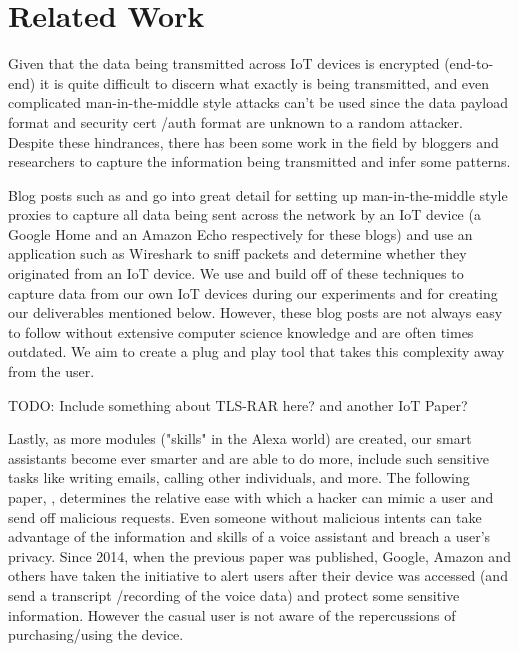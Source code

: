 \documentclass[letterpaper,twocolumn,10pt]{article}
\begin{document}
\section{Related Work}

Given that the data being transmitted across IoT devices is encrypted (end-to-end) it is quite difficult to discern what exactly is being transmitted, and even complicated man-in-the-middle style attacks can’t be used since the data payload format and security cert \slash auth format are unknown to a random attacker. 
Despite these hindrances, there has been some work in the field by bloggers and researchers to capture the information being transmitted and infer some patterns. 

Blog posts such as \cite{ghadiry_2017} and \cite{morgenstern_morgenstern_2018} go into great detail for setting up man-in-the-middle style proxies to capture all data being sent across the network by an IoT device (a Google Home and an Amazon Echo respectively for these blogs) and use an application such as Wireshark to sniff packets and determine whether they originated from an IoT device. 
We use and build off of these techniques to capture data from our own IoT devices during our experiments and for creating our deliverables mentioned below. 
However, these blog posts are not always easy to follow without extensive computer science knowledge and are often times outdated. We aim to create a plug and play tool that takes this complexity away from the user.

TODO: Include something about TLS-RAR here? and another IoT Paper?

Lastly, as more modules ("skills" in the Alexa world) are created, our smart assistants become ever smarter and are able to do more, include such sensitive tasks like writing emails, calling other individuals, and more. 
The following paper, \cite{Diao2014YVA2666620.2666623}, determines the relative ease with which a hacker can mimic a user and send off malicious requests. 
Even someone without malicious intents can take advantage of the information and skills of a voice assistant and breach a user’s privacy. 
Since 2014, when the previous paper was published, Google, Amazon and others have taken the initiative to alert users after their device was accessed (and send a transcript \slash recording of the voice data) and protect some sensitive information. 
However the casual user is not aware of the repercussions of purchasing/using the device. 
\end{document}
